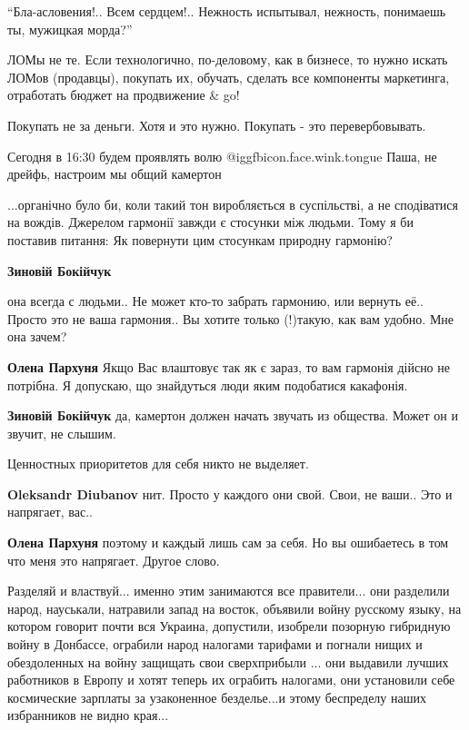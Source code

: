 \begin{itemize}
\enquote{Бла-асловения!.. Всем сердцем!.. Нежность испытывал, нежность, понимаешь ты, мужицкая морда?}


ЛОМы не те. Если технологично, по-деловому, как в бизнесе, то нужно искать
ЛОМов (продавцы), покупать их, обучать, сделать все компоненты маркетинга,
отработать бюджет на продвижение \& go!

Покупать не за деньги. Хотя и это нужно. Покупать - это перевербовывать.

Сегодня в 16:30 будем проявлять волю  @igg{fbicon.face.wink.tongue}  Паша, не дрейфь, настроим мы общий камертон


...органічно було би, коли такий тон виробляється в суспільстві, а не
сподіватися на вождів. Джерелом гармонії завжди є стосунки між людьми. Тому я
би поставив питання: Як повернути цим стосункам природну гармонію?

\begin{itemize} %
\textbf{Зиновій Бокійчук} 

она всегда с людьми.. Не может кто-то забрать гармонию, или вернуть её.. Просто
это не ваша гармония.. Вы хотите только (!)такую, как вам удобно. Мне она зачем?


\textbf{Олена Пархуня} Якщо Вас влаштовує так як є зараз, то вам гармонія дійсно не потрібна. Я допускаю, що знайдуться люди яким подобатися какафонія.

\textbf{Зиновій Бокійчук} да, камертон должен начать звучать из общества. Может он и звучит, не слышим.
\end{itemize} %

Ценностных приоритетов для себя никто не выделяет.

\begin{itemize} %
\textbf{Oleksandr Diubanov} нит. Просто у каждого они свой. Свои, не ваши.. Это и напрягает, вас..

\textbf{Олена Пархуня} поэтому и каждый лишь сам за себя. Но вы ошибаетесь в том что меня это напрягает. Другое слово.
\end{itemize} %


Разделяй и властвуй... именно этим занимаются все правители... они разделили
народ, науськали, натравили запад на восток, объявили войну русскому языку, на
котором говорит почти вся Украина, допустили, изобрели позорную гибридную войну
в Донбассе, ограбили народ налогами тарифами и погнали нищих и обездоленных на
войну защищать свои сверхприбыли ... они выдавили лучших работников в Европу и
хотят теперь их ограбить налогами, они установили себе космические зарплаты за
узаконенное безделье...и этому беспределу наших избранников не видно края...


\end{itemize}
